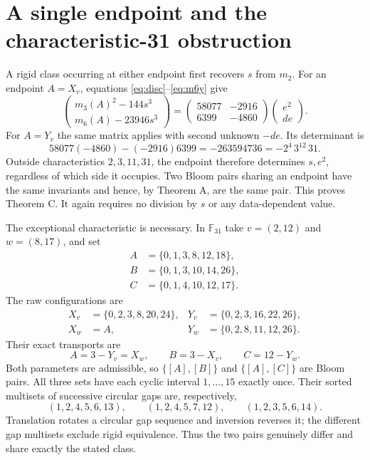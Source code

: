 \documentclass[11pt]{article}
\newcommand{\F}{\mathbb F}
\begin{document}
\section{A single endpoint and the characteristic-31 obstruction}\label{sec:partner}
A rigid class occurring at either endpoint first recovers $s$ from $m_2$.
For an endpoint $A=X_v$, equations \eqref{eq:disc}--\eqref{eq:m6y} give
\begin{equation}
 \begin{pmatrix}m_3(A)^2-144s^3\\m_6(A)-23946s^3\end{pmatrix}
 =\begin{pmatrix}58077&-2916\\6399&-4860\end{pmatrix}
 \begin{pmatrix}e^2\\de\end{pmatrix}.\label{eq:endpoint}
\end{equation}
For $A=Y_v$ the same matrix applies with second unknown $-de$.
Its determinant is
\[
 58077(-4860)-(-2916)6399
 =-263594736=-2^4\,3^{12}\,31.
\]
Outside characteristics $2,3,11,31$, the endpoint therefore determines
$s,e^2$, regardless of which side it occupies. Two Bloom pairs sharing
an endpoint have the same invariants and hence, by Theorem A, are the
same pair. This proves Theorem C. It again requires no division by $s$
or any data-dependent value.

The exceptional characteristic is necessary. In $\F_{31}$ take
$v=(2,12)$ and $w=(8,17)$, and set
\begin{align*}
 A&=\{0,1,3,8,12,18\},\\
 B&=\{0,1,3,10,14,26\},\\
 C&=\{0,1,4,10,12,17\}.
\end{align*}
The raw configurations are
\begin{align*}
 X_v&=\{0,2,3,8,20,24\},&Y_v&=\{0,2,3,16,22,26\},\\
 X_w&=A,&Y_w&=\{0,2,8,11,12,26\}.
\end{align*}
Their exact transports are
\[
 A=3-Y_v=X_w,\qquad B=3-X_v,\qquad C=12-Y_w.
\]
Both parameters are admissible, so $\{[A],[B]\}$ and
$\{[A],[C]\}$ are Bloom pairs. All three sets have each cyclic
interval $1,\ldots,15$ exactly once. Their sorted multisets of
successive circular gaps are, respectively,
\[
 (1,2,4,5,6,13),\qquad (1,2,4,5,7,12),\qquad (1,2,3,5,6,14).
\]
Translation rotates a circular gap sequence and inversion reverses it;
the different gap multisets exclude rigid equivalence. Thus the two
pairs genuinely differ and share exactly the stated class.
\end{document}
